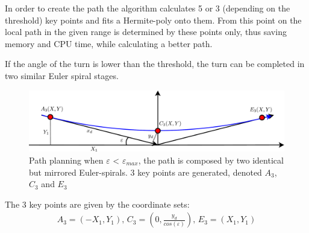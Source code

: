 In order to create the path the algorithm calculates 5 or 3 (depending on the threshold) key points and fits a Hermite-poly onto them. From this point on the local path in the given range is determined by these points only, thus saving memory and CPU time, while calculating a better path.


If the angle of the turn is lower than the threshold, the turn can be completed in two similar Euler spiral stages.
\begin{figure}
	\begin{center}
		\includegraphics[width=\textwidth]{img/LocalPlannerFigures/3Points.pdf}
		\caption{Path planning when $\varepsilon$ < $\varepsilon_{max}$, the path is composed by two identical but mirrored Euler-spirals. 3 key points are generated, denoted $A_3$, $C_3$ and $E_3$}
		\label{fig:3points}
	\end{center}
\end{figure}

The 3 key points are given by the coordinate sets:
\begin{align}
A_3 = (-X_1,Y_1),\, C_3 = (0,\frac{y_d}{cos(\varepsilon)}),\, E_3 = (X_1,Y_1)
\end{align}

